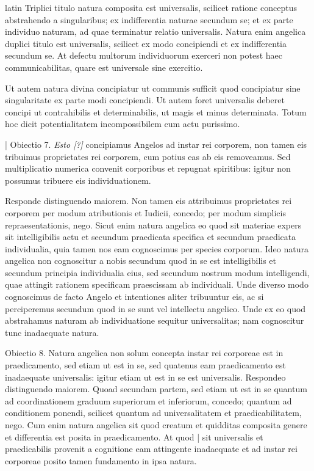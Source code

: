 \begin{otherlanguage*}{latin}
\pstart
Triplici titulo natura composita est universalis, scilicet ratione conceptus abstrahendo a singularibus; ex indifferentia naturae secundum se; et ex parte individuo naturam, ad quae terminatur relatio universalis. Natura enim angelica duplici titulo est universalis, scilicet ex modo concipiendi et ex indifferentia secundum se. At defectu multorum individuorum exerceri non potest haec communicabilitas, quare est universale sine exercitio. 
\pend

\pstart
Ut autem natura divina concipiatur ut communis sufficit quod concipiatur sine singularitate ex parte modi concipiendi. Ut autem foret universalis deberet concipi ut contrahibilis et determinabilis, ut magis et minus determinata. Totum hoc dicit potentialitatem incompossibilem cum actu purissimo. 
\pend

\pstart
\textnormal{|} Obiectio 7. \emph{Esto [?]} concipiamus Angelos ad instar rei corporem, non tamen eis tribuimus proprietates rei corporem, cum potius eas ab eis removeamus. Sed multiplicatio numerica convenit corporibus et repugnat spiritibus:
igitur non possumus tribuere eis individuationem. 
\pend

\pstart
Responde distinguendo maiorem. Non tamen eis attribuimus proprietates rei corporem per modum atributionis et Iudicii, concedo; per modum simplicis repraesentationis, nego. Sicut enim natura angelica eo quod sit materiae expers sit intelligibilis actu et secundum praedicata specifica et secundum praedicata individualia, quia tamen nos eam cognoscimus per species corporum. Ideo natura angelica non cognoscitur a nobis secundum quod in se est intelligibilis et secundum principia individualia eius, sed secundum nostrum modum intelligendi, quae attingit rationem specificam praescissam ab individuali. Unde diverso modo cognoscimus de facto Angelo et intentiones aliter tribuuntur eis, ac si perciperemus secundum quod in se sunt vel intellectu angelico. Unde ex eo quod abstrahamus naturam ab individuatione sequitur universalitas; nam cognoscitur tunc inadaequate natura. 
\pend

\pstart
Obiectio 8. Natura angelica non solum concepta instar rei corporeae est in praedicamento, sed etiam ut est in se, sed quatenus eam praedicamento est inadaequate universalis:
igitur etiam ut est in se est universalis. Respondeo distinguendo maiorem. Quoad secundam partem, sed etiam ut est in se quantum ad coordinationem graduum superiorum et inferiorum, concedo; quantum ad conditionem ponendi, scilicet quantum ad universalitatem et praedicabilitatem, nego. Cum enim natura angelica sit quod creatum et quidditas composita genere et differentia est posita in praedicamento. At quod \textnormal{|} sit universalis et praedicabilis provenit a cognitione eam attingente inadaequate et ad instar rei corporeae posito tamen fundamento in ipsa natura. 
\pend


\end{otherlanguage*}

